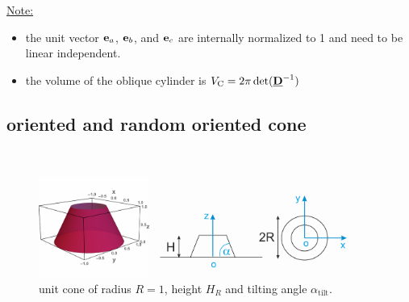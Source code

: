 \noindent\uline{Note:}
\begin{itemize}
\item the unit vector $\B{e}_a$, $\B{e}_b$, and $\B{e}_c$ are internally normalized to 1 and need to be linear independent.
\item the volume of the oblique cylinder is $V_\mathrm{C}=2\pi\det(\M{D}^{-1})$
\end{itemize}

\subsection{oriented and random oriented cone} ~\\

\begin{figure}[htb]
\begin{center}
\includegraphics[width=0.9\textwidth]{../images/form_factor/oriented_primitive_opbjects/cone.png}
\end{center}
\caption{unit cone of radius $R=1$, height $H_R$ and  tilting angle $\alpha_\mathrm{tilt}$.}
\label{fig:opo_cone}
\end{figure}

